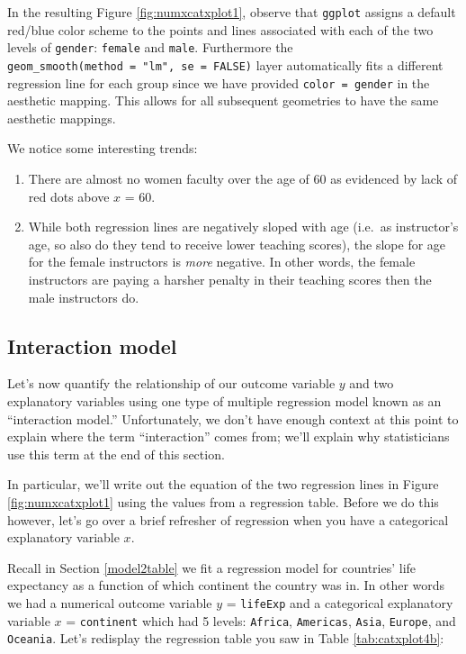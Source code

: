 \documentclass[12pt, krantz2,]{krantz}
\providecommand{\tightlist}{%
  \setlength{\itemsep}{0pt}\setlength{\parskip}{0pt}}
\begin{document}
In the resulting Figure \ref{fig:numxcatxplot1}, observe that \texttt{ggplot} assigns a default red/blue color scheme to the points and lines associated with each of the two levels of \texttt{gender}: \texttt{female} and \texttt{male}. Furthermore the \texttt{geom\_smooth(method\ =\ "lm",\ se\ =\ FALSE)} layer automatically fits a different regression line for each group since we have provided \texttt{color\ =\ gender} in the aesthetic mapping. This allows for all subsequent geometries to have the same aesthetic mappings.

We notice some interesting trends:

\begin{enumerate}
\def\labelenumi{\arabic{enumi}.}
\tightlist
\item
  There are almost no women faculty over the age of 60 as evidenced by lack of red dots above \(x\) = 60.
\item
  While both regression lines are negatively sloped with age (i.e.~as instructor's age, so also do they tend to receive lower teaching scores), the slope for age for the female instructors is \emph{more} negative. In other words, the female instructors are paying a harsher penalty in their teaching scores then the male instructors do.
\end{enumerate}

\hypertarget{model4interactiontable}{%
\subsection{Interaction model}\label{model4interactiontable}}

Let's now quantify the relationship of our outcome variable \(y\) and two explanatory variables using one type of multiple regression model known as an ``interaction model.'' Unfortunately, we don't have enough context at this point to explain where the term ``interaction'' comes from; we'll explain why statisticians use this term at the end of this section.

In particular, we'll write out the equation of the two regression lines in Figure \ref{fig:numxcatxplot1} using the values from a regression table. Before we do this however, let's go over a brief refresher of regression when you have a categorical explanatory variable \(x\).

Recall in Section \ref{model2table} we fit a regression model for countries' life expectancy as a function of which continent the country was in. In other words we had a numerical outcome variable \(y\) = \texttt{lifeExp} and a categorical explanatory variable \(x\) = \texttt{continent} which had 5 levels: \texttt{Africa}, \texttt{Americas}, \texttt{Asia}, \texttt{Europe}, and \texttt{Oceania}. Let's redisplay the regression table you saw in Table \ref{tab:catxplot4b}:
\end{document}
